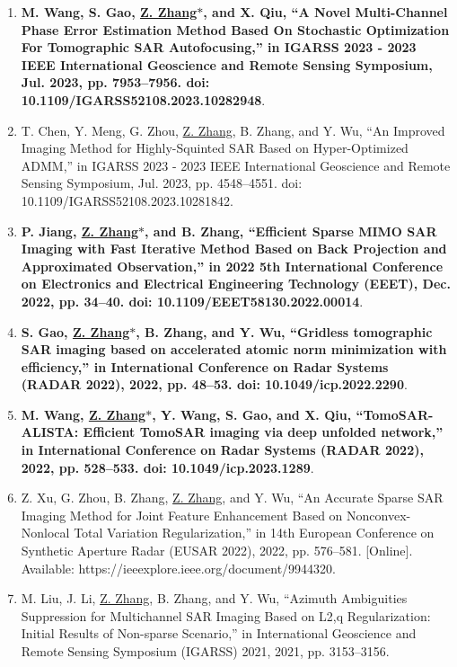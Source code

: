\documentclass[paper=a4,fontsize=11pt]{scrartcl}
\begin{document}
\begin{enumerate}
	
\item \textbf{ M. Wang, S. Gao, \underline{Z. Zhang$\ast$}, and X. Qiu, ``A Novel Multi-Channel Phase Error Estimation Method Based On Stochastic Optimization For Tomographic SAR Autofocusing,'' in IGARSS 2023 - 2023 IEEE International Geoscience and Remote Sensing Symposium, Jul. 2023, pp. 7953–7956. doi: 10.1109/IGARSS52108.2023.10282948}.

\item T. Chen, Y. Meng, G. Zhou, \underline{Z. Zhang}, B. Zhang, and Y. Wu, ``An Improved Imaging Method for Highly-Squinted SAR Based on Hyper-Optimized ADMM,'' in IGARSS 2023 - 2023 IEEE International Geoscience and Remote Sensing Symposium, Jul. 2023, pp. 4548–4551. doi: 10.1109/IGARSS52108.2023.10281842.
	
\item \textbf{P. Jiang, \underline{Z. Zhang$\ast$}, and B. Zhang, ``Efficient Sparse MIMO SAR Imaging with Fast Iterative Method Based on Back Projection and Approximated Observation,'' in 2022 5th International Conference on Electronics and Electrical Engineering Technology (EEET), Dec. 2022, pp. 34–40. doi: 10.1109/EEET58130.2022.00014}.

\item \textbf{S. Gao, \underline{Z. Zhang$\ast$}, B. Zhang, and Y. Wu, ``Gridless tomographic SAR imaging based on accelerated atomic norm minimization with efficiency,'' in International Conference on Radar Systems (RADAR 2022), 2022, pp. 48–53. doi: 10.1049/icp.2022.2290}.

\item \textbf{M. Wang, \underline{Z. Zhang$\ast$}, Y. Wang, S. Gao, and X. Qiu, ``TomoSAR-ALISTA: Efficient TomoSAR imaging via deep unfolded network,'' in International Conference on Radar Systems (RADAR 2022), 2022, pp. 528–533. doi: 10.1049/icp.2023.1289}.

\item Z. Xu, G. Zhou, B. Zhang, \underline{Z. Zhang}, and Y. Wu, ``An Accurate Sparse SAR Imaging Method for Joint Feature Enhancement Based on Nonconvex-Nonlocal Total Variation Regularization,'' in 14th European Conference on Synthetic Aperture Radar (EUSAR 2022), 2022, pp. 576–581. [Online]. Available: https://ieeexplore.ieee.org/document/9944320.
	
\item M. Liu, J. Li, \underline{Z. Zhang}, B. Zhang, and Y. Wu, ``Azimuth Ambiguities Suppression for Multichannel SAR Imaging Based on L2,q Regularization: Initial Results of Non-sparse Scenario,'' in International Geoscience and Remote Sensing Symposium (IGARSS) 2021, 2021, pp. 3153–3156.


\end{enumerate}
\end{document}
